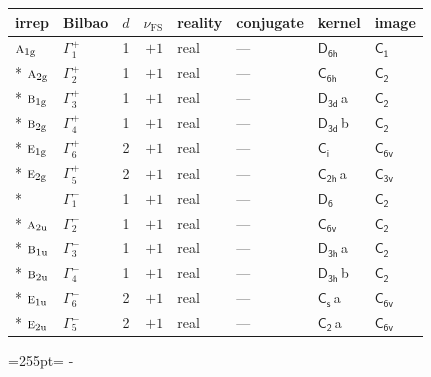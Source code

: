 \documentclass[10pt,a4paper]{article}
\newcommand{\needspace}[1]{\par\penalty-100\begingroup\dimen0=#1\relax\dimen2=\pagegoal
  \advance\dimen2-\pagetotal\ifdim\dimen0>\dimen2\relax\ifdim\dimen2>0pt\vfil\break\fi\fi
  \endgroup}
\numberwithin{equation}{section}
\newcommand{\grp}[1]{\mathsf{#1}}
\newcommand{\irr}[1]{\text{\normalfont\scshape #1}}
\newcommand{\detbox}[1]{{\setlength{\fboxsep}{1pt}\fbox{#1}}}
\newcommand{\ptag}[1]{\mathrm{#1}}
\newcommand{\clsletter}[1]{\,{\scriptsize\color{black!55}#1}}
\newcommand{\fsind}{\nu_{\mathrm{FS}}}
\begin{document}
{\small\renewcommand{\arraystretch}{1.25}\begin{longtable}{@{}llrrllll@{}}\toprule
irrep & Bilbao & $d$ & $\fsind$ & reality & conjugate & kernel & image\\\midrule\endhead
\bottomrule\endfoot\endlastfoot
$\irr{a}_{1\ptag{g}}$ & $\Gamma_{1}^{+}$ & 1 & $+1$ & real & --- & \href{D6h.pdf}{$\grp{D_{6h}}$} & \href{C1.pdf}{$\grp{C_{1}}$}\\*
$\irr{a}_{2\ptag{g}}$ & $\Gamma_{2}^{+}$ & 1 & $+1$ & real & --- & \href{C6h.pdf}{$\grp{C_{6h}}$} & \href{C2.pdf}{$\grp{C_{2}}$}\\*
$\irr{b}_{1\ptag{g}}$ & $\Gamma_{3}^{+}$ & 1 & $+1$ & real & --- & \href{D3d.pdf}{$\grp{D_{3d}}$}\clsletter{a} & \href{C2.pdf}{$\grp{C_{2}}$}\\*
$\irr{b}_{2\ptag{g}}$ & $\Gamma_{4}^{+}$ & 1 & $+1$ & real & --- & \href{D3d.pdf}{$\grp{D_{3d}}$}\clsletter{b} & \href{C2.pdf}{$\grp{C_{2}}$}\\*
$\irr{e}_{1\ptag{g}}$ & $\Gamma_{6}^{+}$ & 2 & $+1$ & real & --- & \href{S2.pdf}{$\grp{C_{i}}$} & \href{C6v.pdf}{$\grp{C_{6v}}$}\\*
$\irr{e}_{2\ptag{g}}$ & $\Gamma_{5}^{+}$ & 2 & $+1$ & real & --- & \href{C2h.pdf}{$\grp{C_{2h}}$}\clsletter{a} & \href{C3v.pdf}{$\grp{C_{3v}}$}\\*
\detbox{$\irr{a}_{1\ptag{u}}$} & $\Gamma_{1}^{-}$ & 1 & $+1$ & real & --- & \href{D6.pdf}{$\grp{D_{6}}$} & \href{C2.pdf}{$\grp{C_{2}}$}\\*
$\irr{a}_{2\ptag{u}}$ & $\Gamma_{2}^{-}$ & 1 & $+1$ & real & --- & \href{C6v.pdf}{$\grp{C_{6v}}$} & \href{C2.pdf}{$\grp{C_{2}}$}\\*
$\irr{b}_{1\ptag{u}}$ & $\Gamma_{3}^{-}$ & 1 & $+1$ & real & --- & \href{D3h.pdf}{$\grp{D_{3h}}$}\clsletter{a} & \href{C2.pdf}{$\grp{C_{2}}$}\\*
$\irr{b}_{2\ptag{u}}$ & $\Gamma_{4}^{-}$ & 1 & $+1$ & real & --- & \href{D3h.pdf}{$\grp{D_{3h}}$}\clsletter{b} & \href{C2.pdf}{$\grp{C_{2}}$}\\*
$\irr{e}_{1\ptag{u}}$ & $\Gamma_{6}^{-}$ & 2 & $+1$ & real & --- & \href{C1v.pdf}{$\grp{C_{s}}$}\clsletter{a} & \href{C6v.pdf}{$\grp{C_{6v}}$}\\*
$\irr{e}_{2\ptag{u}}$ & $\Gamma_{5}^{-}$ & 2 & $+1$ & real & --- & \href{C2.pdf}{$\grp{C_{2}}$}\clsletter{a} & \href{C6v.pdf}{$\grp{C_{6v}}$}\\
\bottomrule\end{longtable}}
\needspace{255pt}
\end{document}
